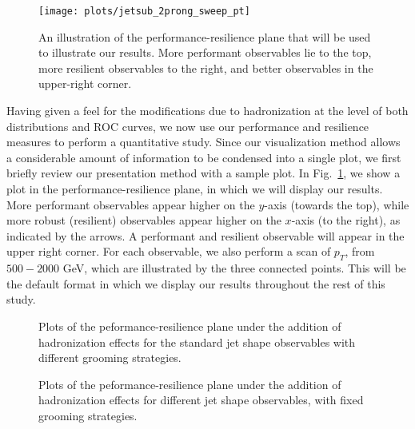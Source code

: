 \begin{figure}
\begin{center}
\texttt{[image: plots/jetsub\_2prong\_sweep\_pt]}
\end{center}
\caption{An illustration of the performance-resilience plane that will be used to illustrate our results. More performant observables lie to the top, more resilient observables to the right, and better observables in the upper-right corner.}
\label{fig:SM_jetsub_2prong:sweep_pt}
\end{figure}

Having given a feel for the modifications due to hadronization at the level of both distributions and ROC curves, we now use our performance and resilience measures to perform a quantitative study.
%
Since our visualization method allows a considerable amount of information to be condensed into a single plot, we first briefly review our presentation method with a sample plot.
%
In Fig.~\ref{fig:SM_jetsub_2prong:sweep_pt}, we show a plot in the performance-resilience plane, in which we will display our results.
%
More performant observables appear higher on the $y$-axis (towards the top), while more robust (resilient) observables appear higher on the $x$-axis (to the right), as indicated by the arrows.
%
A performant and resilient observable will appear in the upper right corner.
%
For each observable, we also perform a scan of $p_T$, from $500-2000$ GeV, which are illustrated by the three connected points.
%
This will be the default format in which we display our results throughout the rest of this study.


\begin{figure}
  \caption{Plots of the peformance-resilience plane under the addition of hadronization effects for the standard jet shape observables with different grooming strategies.}\label{fig:SM_jetsub_2prong:grooming-hadronisation}
\end{figure}

\begin{figure}
  \caption{Plots of the peformance-resilience plane under the addition of hadronization effects for different jet shape observables, with fixed grooming strategies.}\label{fig:SM_jetsub_2prong:shapes-hadronisation}
\end{figure}



